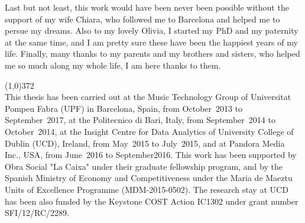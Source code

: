 Last but not least, this work would have been never been possible without the support of my wife Chiara, who followed me to Barcelona and helped me to persue my dreams. Also to my lovely Olivia, I started my PhD and my paternity at the same time, and I am pretty sure these have been the happiest years of my life. Finally, many thanks to my parents and my brothers and sisters, who helped me so much along my whole life, I am here thanks to them.

\vspace*{\fill}

\line(1,0){372}\\
\footnotesize
This thesis has been carried out at the Music Technology Group of Universitat Pompeu Fabra (UPF) in Barcelona, Spain, from October~2013 to September~2017, at the Politecnico di Bari, Italy, from September~2014 to October~2014, at the Insight Centre for Data Analytics of University College of Dublin (UCD), Ireland, from May~2015 to July~2015, and at Pandora Media Inc., USA, from June~2016 to September2016. This work has been supported by Obra Social "La Caixa" under their graduate fellowship program, and by the Spanish Ministry of Economy and Competitiveness under the Maria de Maeztu Units of Excellence Programme (MDM-2015-0502). The research stay at UCD has been also funded by the Keystone COST Action IC1302 under grant number SFI/12/RC/2289.
\normalsize